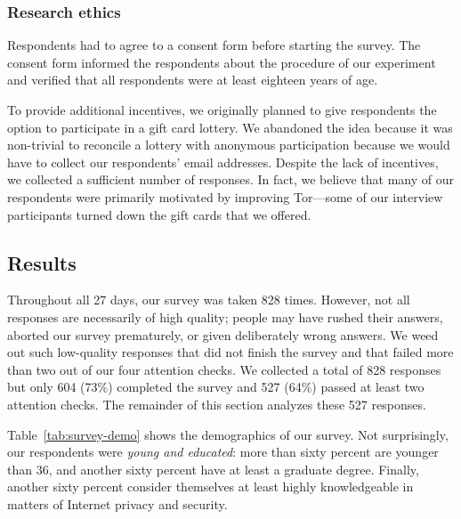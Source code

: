 \subsubsection{Research ethics}
Respondents had to agree to a consent form before starting the survey. The
consent form informed the respondents about the procedure of our experiment and
verified that all respondents were at least eighteen years of age.

To provide additional incentives, we originally planned to give respondents the
option to participate in a gift card lottery.  We abandoned the idea because it
was non-trivial to reconcile a lottery with anonymous participation because we
would have to collect our respondents' email addresses.  Despite the lack of
incentives, we collected a sufficient number of responses.  In fact, we believe
that many of our respondents were primarily motivated by improving Tor---some of
our interview participants turned down the gift cards that we offered.

\subsection{Results}
\label{sec:results}

Throughout all 27 days, our survey was taken 828 times.  However, not all
responses are necessarily of high quality; people may have rushed their answers,
aborted our survey prematurely, or given deliberately wrong answers.  We weed
out such low-quality responses that \first did not finish the survey and that
\second failed more than two out of our four attention checks.  We collected a
total of 828 responses but only 604 (73\%) completed the survey and 527 (64\%)
passed at least two attention checks.  The remainder of this section analyzes
these 527 responses.

Table~\ref{tab:survey-demo} shows the demographics of our survey.  Not
surprisingly, our respondents were \emph{young and educated}: more than sixty
percent are younger than 36, and another sixty percent have at least a graduate
degree.  Finally, another sixty percent consider themselves at least highly
knowledgeable in matters of Internet privacy and security.

